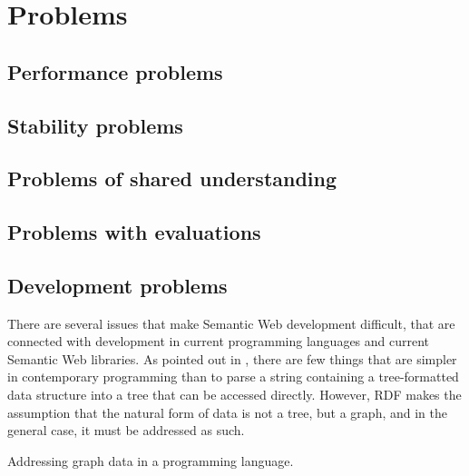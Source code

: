 \section{Problems}\label{sec:problems}

\subsection{Performance problems}\label{sec:perfproblems}

\subsection{Stability problems}\label{sec:stabproblems}

\subsection{Problems of shared understanding}\label{sec:semproblems}

\subsection{Problems with evaluations}\label{sec:evalproblems}

\subsection{Development problems}\label{sec:devproblems}

There are several issues that make Semantic Web development difficult,
that are connected with development in current programming languages
and current Semantic Web libraries. As pointed out in \cite{darobin1},
there are few things that are simpler in contemporary programming than
to parse a string containing a tree-formatted data structure into a
tree that can be accessed directly. However, RDF makes the assumption
that the natural form of data is not a tree, but a graph, and in the
general case, it must be addressed as such.

\begin{problem}\label{prob:graph}
Addressing graph data in a programming language.
\end{problem}
